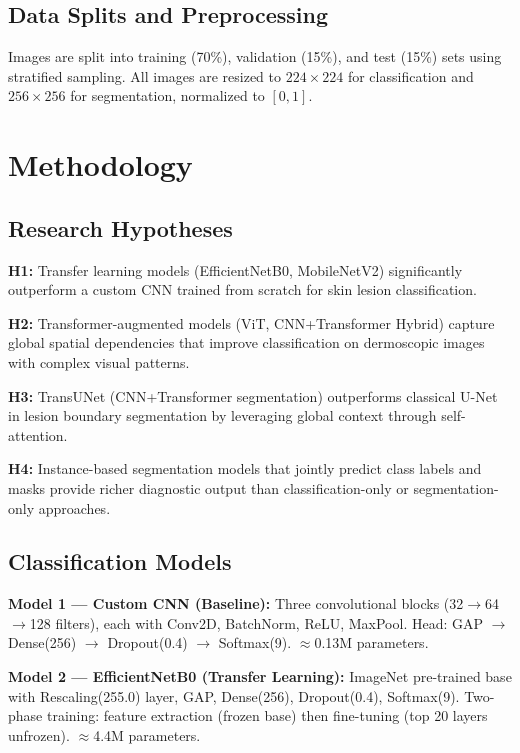\documentclass[10pt,twocolumn]{article}
\begin{document}
\subsection{Data Splits and Preprocessing}

Images are split into training (70\%), validation (15\%), and test (15\%) sets using stratified sampling. All images are resized to $224 \times 224$ for classification and $256 \times 256$ for segmentation, normalized to $[0, 1]$.

\section{Methodology}

\subsection{Research Hypotheses}

\textbf{H1:} Transfer learning models (EfficientNetB0, MobileNetV2) significantly outperform a custom CNN trained from scratch for skin lesion classification.

\textbf{H2:} Transformer-augmented models (ViT, CNN+Transformer Hybrid) capture global spatial dependencies that improve classification on dermoscopic images with complex visual patterns.

\textbf{H3:} TransUNet (CNN+Transformer segmentation) outperforms classical U-Net in lesion boundary segmentation by leveraging global context through self-attention.

\textbf{H4:} Instance-based segmentation models that jointly predict class labels and masks provide richer diagnostic output than classification-only or segmentation-only approaches.

\subsection{Classification Models}

\textbf{Model 1 --- Custom CNN (Baseline):} Three convolutional blocks (32$\rightarrow$64$\rightarrow$128 filters), each with Conv2D, BatchNorm, ReLU, MaxPool. Head: GAP $\rightarrow$ Dense(256) $\rightarrow$ Dropout(0.4) $\rightarrow$ Softmax(9). $\approx$0.13M parameters.

\textbf{Model 2 --- EfficientNetB0 (Transfer Learning):} ImageNet pre-trained base with Rescaling(255.0) layer, GAP, Dense(256), Dropout(0.4), Softmax(9). Two-phase training: feature extraction (frozen base) then fine-tuning (top 20 layers unfrozen). $\approx$4.4M parameters.
\end{document}
